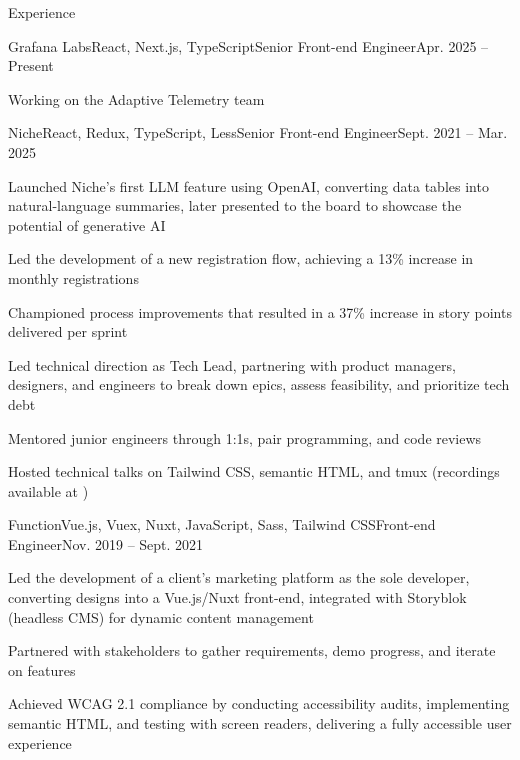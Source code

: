 \documentclass{resume} %
\begin{document}
\begin{rSection}{Experience}

  \begin{rSubsection}{Grafana Labs}{React, Next.js, TypeScript}{Senior Front-end Engineer}{Apr. 2025 – Present}
    \item Working on the Adaptive Telemetry team
  \end{rSubsection}
  
  \begin{rSubsection}{Niche}{React, Redux, TypeScript, Less}{Senior Front-end Engineer}{Sept. 2021 – Mar. 2025}
    \item Launched Niche’s first LLM feature using OpenAI, converting data tables into natural-language summaries, later presented to the board to showcase the potential of generative AI
    \item Led the development of a new registration flow, achieving a 13\% increase in monthly registrations

    
    \item Championed process improvements that resulted in a 37\% increase in story points delivered per sprint
    \item Led technical direction as Tech Lead, partnering with product managers, designers, and engineers to break down epics, assess feasibility, and prioritize tech debt
    \item Mentored junior engineers through 1:1s, pair programming, and code reviews
    \item Hosted technical talks on Tailwind CSS, semantic HTML, and tmux (recordings available at \href{http://jgs.lol/}{})
  \end{rSubsection}

  \begin{rSubsection}{Function}{Vue.js, Vuex, Nuxt, JavaScript, Sass, Tailwind CSS}{Front-end Engineer}{Nov. 2019 – Sept. 2021}
    \item Led the development of a client’s marketing platform as the sole developer, converting designs into a Vue.js/Nuxt front-end, integrated with Storyblok (headless CMS) for dynamic content management
    \item Partnered with stakeholders to gather requirements, demo progress, and iterate on features
    \item Achieved WCAG 2.1 compliance by conducting accessibility audits, implementing semantic HTML, and testing with screen readers, delivering a fully accessible user experience
  \end{rSubsection}

\end{rSection}
\end{document}
